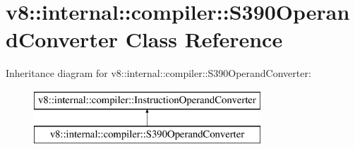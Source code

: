 \hypertarget{classv8_1_1internal_1_1compiler_1_1_s390_operand_converter}{}\section{v8\+:\+:internal\+:\+:compiler\+:\+:S390\+Operand\+Converter Class Reference}
\label{classv8_1_1internal_1_1compiler_1_1_s390_operand_converter}
Inheritance diagram for v8\+:\+:internal\+:\+:compiler\+:\+:S390\+Operand\+Converter\+:\begin{figure}[H]
\begin{center}
\leavevmode
\includegraphics[height=2.000000cm]{classv8_1_1internal_1_1compiler_1_1_s390_operand_converter}
\end{center}
\end{figure}
